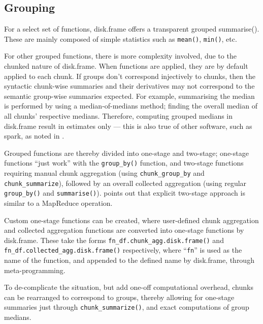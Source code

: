 \documentclass[10pt,a4paper]{article}
\begin{document}
\subsection{Grouping}
\label{sec:spec-cons-group-by}

For a select set of functions, disk.frame offers a transparent grouped
\textrm{summarise()}. These are mainly composed of simple statistics
such as \texttt{mean()}, \texttt{min()}, etc.

For other grouped functions, there is more complexity involved, due to
the chunked nature of disk.frame. When functions are applied, they are
by default applied to each chunk. If groups don't correspond
injectively to chunks, then the syntactic chunk-wise summaries and
their derivatives may not correspond to the semantic group-wise
summaries expected. For example, summarising the median is performed
by using a median-of-medians method; finding the overall median of all
chunks' respective medians. Therefore, computing grouped medians in
disk.frame result in estimates only --- this is also true of other
software, such as spark, as noted in \textcite{zj19:_group_by}.

Grouped functions are thereby divided into one-stage and two-stage;
one-stage functions ``just work'' with the \texttt{group\_by()}
function, and two-stage functions requiring manual chunk aggregation
(using \texttt{chunk\_group\_by} and \texttt{chunk\_summarize}),
followed by an overall collected aggregation (using regular
\texttt{group\_by()} and \texttt{summarise()}).
\textcite{zj19:_group_by} points out that explicit two-stage approach
is similar to a MapReduce operation.

Custom one-stage functions can be created, where user-defined chunk
aggregation and collected aggregation functions are converted into
one-stage functions by
disk.frame\cite{zj19:_custom_one_stage_group_by_funct}. These take the
forms \texttt{fn\_df.chunk\_agg.disk.frame()} and
\texttt{fn\_df.collected\_agg.disk.frame()} respectively, where
``\texttt{fn}'' is used as the name of the function, and appended to
the defined name by disk.frame, through meta-programming.

To de-complicate the situation, but add one-off computational
overhead, chunks can be rearranged to correspond to groups, thereby
allowing for one-stage summaries just through
\texttt{chunk\_summarize()}, and exact computations of group medians.
\end{document}
